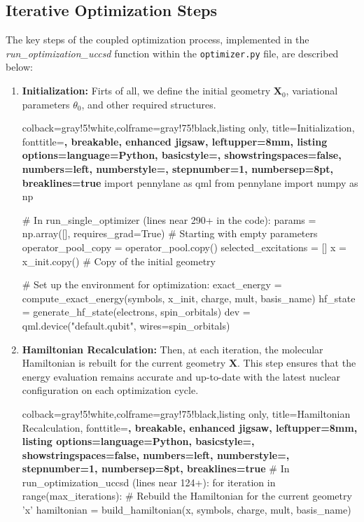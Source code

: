 \subsection{Iterative Optimization Steps}
The key steps of the coupled optimization process, implemented in the \textit{run\_optimization\_uccsd} function within the \texttt{optimizer.py} file, are described below:
\begin{enumerate}
    \item \textbf{Initialization:}
    Firts of all, we define the initial geometry \(\mathbf{X}_0\), variational parameters \(\theta_0\), and other required structures.
    \begin{tcblisting}{colback=gray!5!white,colframe=gray!75!black,listing only,
        title=Initialization, fonttitle=\bfseries, breakable, enhanced jigsaw, leftupper=8mm,
        listing options={language=Python, basicstyle=\ttfamily\small,
        showstringspaces=false, numbers=left, numberstyle=\footnotesize,
        stepnumber=1, numbersep=8pt, breaklines=true}}
import pennylane as qml
from pennylane import numpy as np

# In run_single_optimizer (lines near 290+ in the code):
params = np.array([], requires_grad=True)  # Starting with empty parameters
operator_pool_copy = operator_pool.copy()
selected_excitations = []
x = x_init.copy()  # Copy of the initial geometry

# Set up the environment for optimization:
exact_energy = compute_exact_energy(symbols, x_init, charge, mult, basis_name)
hf_state = generate_hf_state(electrons, spin_orbitals)
dev = qml.device("default.qubit", wires=spin_orbitals)
    \end{tcblisting}

    \item \textbf{Hamiltonian Recalculation:}
    Then, at each iteration, the molecular Hamiltonian is rebuilt for the current geometry \(\mathbf{X}\). This step ensures that the energy evaluation remains accurate and up-to-date with the latest nuclear configuration on each optimization cycle.
    \begin{tcblisting}{colback=gray!5!white,colframe=gray!75!black,listing only,
        title=Hamiltonian Recalculation, fonttitle=\bfseries, breakable, enhanced jigsaw, leftupper=8mm,
        listing options={language=Python, basicstyle=\ttfamily\small,
        showstringspaces=false, numbers=left, numberstyle=\footnotesize,
        stepnumber=1, numbersep=8pt, breaklines=true}}
# In run_optimization_uccsd (lines near 124+):
for iteration in range(max_iterations):
    # Rebuild the Hamiltonian for the current geometry 'x'
    hamiltonian = build_hamiltonian(x, symbols, charge, mult, basis_name)
    

\end{tcblisting}
\end{enumerate}
